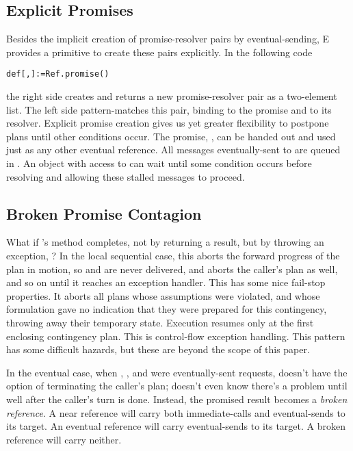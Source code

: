 \documentclass{llncs}
\begin{document}
\subsection{Explicit Promises}

Besides the implicit creation of promise-resolver pairs by
eventual-sending, E provides a primitive to create these pairs
explicitly. In the following code
%
\begin{alltt}
    def [, ] := Ref.promise()
\end{alltt}
%
the right side creates and returns a new promise-resolver pair as a
two-element list. The left side pattern-matches this pair, binding
 to the promise and  to its resolver. Explicit promise
creation gives us yet greater flexibility to postpone plans until
other conditions occur. The promise, , can be handed out and
used just as any other eventual reference. All messages
eventually-sent to  are queued in . An object with
access to  can wait until some condition occurs before
resolving  and allowing these stalled messages to proceed.

\subsection{Broken Promise Contagion}

What if 's  method completes, not by returning a
result, but by throwing an exception, ? In the local sequential
case, this aborts the forward progress of the plan in motion, so
 and  are never delivered, and aborts the
caller's plan as well, and so on until it reaches an exception
handler. This has some nice fail-stop properties. It aborts all plans
whose assumptions were violated, and whose formulation gave no
indication that they were prepared for this contingency, throwing away
their temporary state. Execution resumes only at the first enclosing
contingency plan. This is control-flow exception handling. This
pattern has some difficult hazards, but these are beyond the scope of
this paper.

In the eventual case, when , , and 
were eventually-sent requests,  doesn't have the option of
terminating the caller's plan;  doesn't even know there's a
problem until well after the caller's turn is done. Instead, the
promised result becomes a \emph{broken reference}. A near
reference will carry both immediate-calls and eventual-sends to its
target. An eventual reference will carry eventual-sends to its
target. A broken reference will carry neither.
\end{document}

